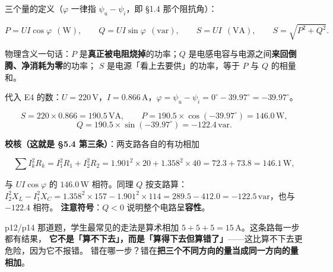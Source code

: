 \documentclass[11pt]{ctexart}
\begin{document}


三个量的定义（$\varphi$ 一律指 $\psi_u-\psi_i$，即 §1.4 那个阻抗角）：

\[ P=UI\cos\varphi\ \ (\mathrm{W}) ,\qquad
   Q=UI\sin\varphi\ \ (\mathrm{var}) ,\qquad
   S=UI\ \ (\mathrm{VA}) ,\qquad
   S=\sqrt{P^{2}+Q^{2}} . \]

物理含义一句话：$P$ 是\textbf{真正被电阻烧掉}的功率；$Q$ 是电感电容与电源之间\textbf{来回倒腾、净消耗为零}的功率；
$S$ 是电源「看上去要供」的功率，等于 $P$ 与 $Q$ 的相量和。

代入 E4 的数：$U=220\,\mathrm{V}$，$I=0.866\,\mathrm{A}$，$\varphi=\psi_u-\psi_i=0^\circ-39.97^\circ=-39.97^\circ$。

\[ S=220\times0.866=190.5\,\mathrm{VA} ,\qquad
   P=190.5\times\cos(-39.97^\circ)=146.0\,\mathrm{W} , \]
\[ Q=190.5\times\sin(-39.97^\circ)=-122.4\,\mathrm{var} . \]

\textbf{校核（这就是 §5.4 第三条）}：两支路各自的有功相加

\[ \sum I_k^{2}R_k=I_1^{2}R_1+I_2^{2}R_2=1.901^{2}\times20+1.358^{2}\times40=72.3+73.8=146.1\,\mathrm{W} , \]

与 $UI\cos\varphi$ 的 $146.0\,\mathrm{W}$ 相符。同理 $Q$ 按支路算：
$I_2^2X_L-I_1^2X_C=1.358^2\times157-1.901^2\times114=289.5-412.0=-122.5\,\mathrm{var}$，也与 $-122.4$ 相符。
\textbf{注意符号}：$Q<0$ 说明整个电路呈\textbf{容性}。




p12/p14 那道题，学生最常见的走法是算术相加 $5+5+5=15\,\mathrm{A}$。这条路每一步都有结果，
\textbf{它不是「算不下去」，而是「算得下去但算错了」}——这比算不下去更危险，因为它不报错。
错在哪一步？错在\textbf{把三个不同方向的量当成同一方向的量相加}。
\end{document}
